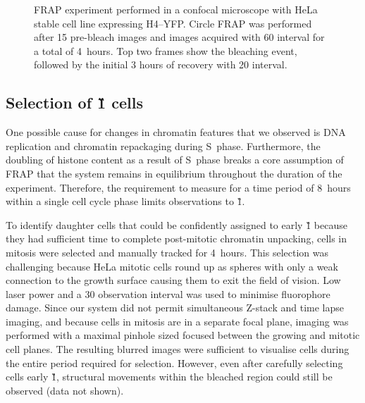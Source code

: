     \begin{figure}
      \centering
        {
          FRAP experiment performed in a confocal microscope with HeLa
          stable cell line expressing H4--YFP.  Circle FRAP was
          performed after 15 pre-bleach images and images acquired
          with \SI{60}{\sec} interval for a total of 4~hours.  Top two
          frames show the bleaching event, followed by the initial 3
          hours of recovery with \SI{20}{\min} interval.
        }
      \label{fig:kill-frap:frap-spot-movement}
    \end{figure}

    \subsection{Selection of \G1{} cells}

    One possible cause for changes in chromatin features that we observed
    is DNA replication and chromatin repackaging during S~phase.
    Furthermore, the doubling of histone content as a result of S~phase breaks
    a core assumption of FRAP that the system remains in equilibrium
    throughout the duration of the experiment.
    Therefore, the requirement to measure for a time period of 8~hours
    within a single cell cycle phase limits observations to \G1{}.

    To identify daughter cells that could be confidently assigned to early \G1{}
    because they had sufficient time to complete
    post-mitotic chromatin unpacking,
    cells in mitosis were selected and manually tracked for 4~hours.
    This selection was challenging because HeLa mitotic cells round up
    as spheres with only a weak connection to the growth surface
    causing them to exit the field of vision.
    Low laser power and a \SI{30}{\min} observation interval
    was used to minimise fluorophore damage.
    Since our system did not permit simultaneous
    Z-stack and time lapse imaging,
    and because cells in mitosis are in a separate focal plane,
    imaging was performed with a maximal pinhole sized focused
    between the growing and mitotic cell planes.
    The resulting blurred images were sufficient to visualise cells during
    the entire period required for selection.
    However, even after carefully selecting cells early \G1{},
    structural movements within the bleached region could
    still be observed (data not shown).

